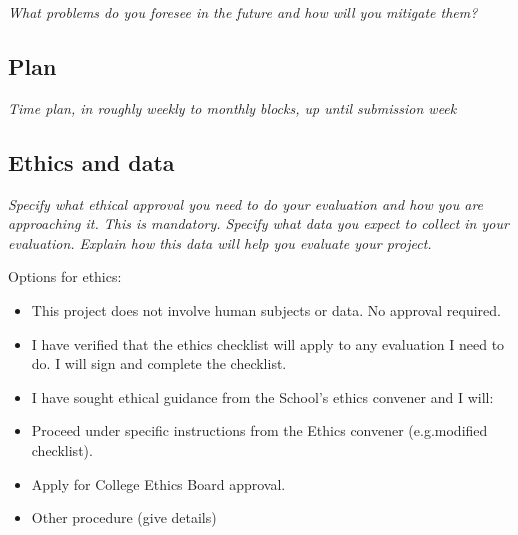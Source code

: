 \documentclass[11pt]{article}
\begin{document}
\emph{{{}What problems do you foresee in the future and how will you
mitigate them?{}}}

\subsection{Plan}\label{plan}

\emph{{{}Time plan, in roughly weekly to monthly blocks, up until
submission week{}}}

    
\subsection{Ethics and data}\label{ethics}
\emph{Specify what ethical approval you need to do your evaluation and how you are approaching it. This is mandatory. 
Specify what data you expect to collect in your evaluation. Explain how this data will help you evaluate your project.
}

Options for ethics:
\begin{itemize}

\item This project does not involve human subjects or data. No approval required.
\item I have verified that the ethics checklist will apply to any evaluation I need to do. I will sign and complete the checklist.
\item I have sought ethical guidance from the School's ethics convener and I will:
    \item Proceed under specific instructions from the Ethics convener (e.g.modified checklist).
    \item Apply for College Ethics Board approval.
    \item Other procedure (give details)
\end{itemize}    
\end{document}
